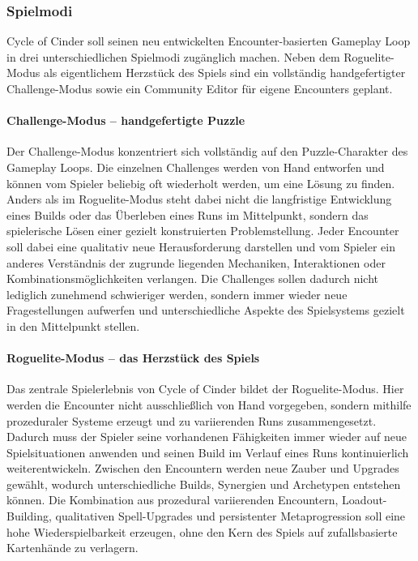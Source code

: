 \subsubsection*{Spielmodi}
Cycle of Cinder soll seinen neu entwickelten Encounter-basierten Gameplay Loop in drei unterschiedlichen Spielmodi zugänglich machen. Neben dem Roguelite-Modus als eigentlichem Herzstück des Spiels sind ein vollständig handgefertigter Challenge-Modus sowie ein Community Editor für eigene Encounters geplant.

    \paragraph{Challenge-Modus -- handgefertigte Puzzle}
    Der Challenge-Modus konzentriert sich vollständig auf den Puzzle-Charakter des Gameplay Loops. Die einzelnen Challenges werden von Hand entworfen und können vom Spieler beliebig oft wiederholt werden, um eine Lösung zu finden. Anders als im Roguelite-Modus steht dabei nicht die langfristige Entwicklung eines Builds oder das Überleben eines Runs im Mittelpunkt, sondern das spielerische Lösen einer gezielt konstruierten Problemstellung.
    Jeder Encounter soll dabei eine qualitativ neue Herausforderung darstellen und vom Spieler ein anderes Verständnis der zugrunde liegenden Mechaniken, Interaktionen oder Kombinationsmöglichkeiten verlangen. Die Challenges sollen dadurch nicht lediglich zunehmend schwieriger werden, sondern immer wieder neue Fragestellungen aufwerfen und unterschiedliche Aspekte des Spielsystems gezielt in den Mittelpunkt stellen.

    \paragraph{Roguelite-Modus -- das Herzstück des Spiels}
    Das zentrale Spielerlebnis von Cycle of Cinder bildet der Roguelite-Modus. Hier werden die Encounter nicht ausschließlich von Hand vorgegeben, sondern mithilfe prozeduraler Systeme erzeugt und zu variierenden Runs zusammengesetzt. Dadurch muss der Spieler seine vorhandenen Fähigkeiten immer wieder auf neue Spielsituationen anwenden und seinen Build im Verlauf eines Runs kontinuierlich weiterentwickeln.
    Zwischen den Encountern werden neue Zauber und Upgrades gewählt, wodurch unterschiedliche Builds, Synergien und Archetypen entstehen können. Die Kombination aus prozedural variierenden Encountern, Loadout-Building, qualitativen Spell-Upgrades und persistenter Metaprogression soll eine hohe Wiederspielbarkeit erzeugen, ohne den Kern des Spiels auf zufallsbasierte Kartenhände zu verlagern.


